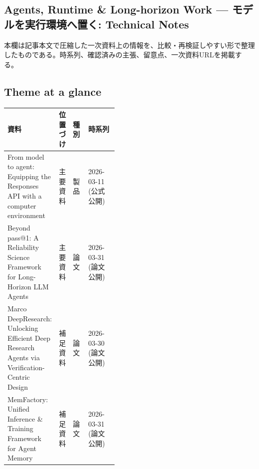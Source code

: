 \subsection*{Agents, Runtime \& Long-horizon Work — モデルを実行環境へ置く: Technical Notes}
本欄は記事本文で圧縮した一次資料上の情報を、比較・再検証しやすい形で整理したものである。時系列、確認済みの主張、留意点、一次資料URLを掲載する。
\medskip
\subsection*{Theme at a glance}
\begin{center}
\footnotesize
\begin{tabularx}{\linewidth}{@{}p{0.20\linewidth}p{0.10\linewidth}p{0.14\linewidth}X@{}}
\toprule
資料 & 位置づけ & 種別 & 時系列 \\
\midrule
From model to agent: Equipping the Responses API with a computer environment & 主要資料 & 製品 & 2026-03-11 (公式公開) \\
Beyond pass@1: A Reliability Science Framework for Long-Horizon LLM Agents & 主要資料 & 論文 & 2026-03-31 (論文公開) \\
Marco DeepResearch: Unlocking Efficient Deep Research Agents via Verification-Centric Design & 補足資料 & 論文 & 2026-03-30 (論文公開) \\
MemFactory: Unified Inference \& Training Framework for Agent Memory & 補足資料 & 論文 & 2026-03-31 (論文公開) \\
\bottomrule
\end{tabularx}
\end{center}
\normalsize

